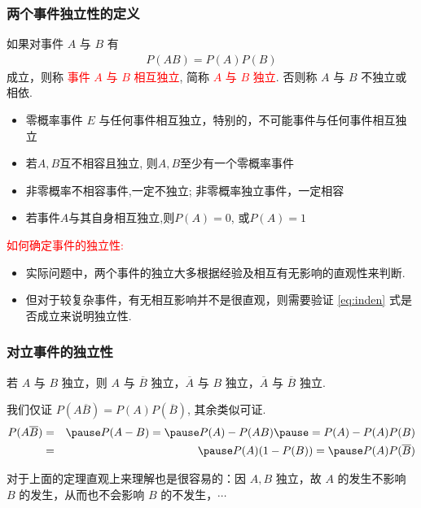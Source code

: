\documentclass[Prob-All.tex]{subfiles}
\begin{document}
\begin{frame}
  \frametitle{两个事件独立性的定义}
  \begin{defi}
    如果对事件 $A$ 与 $B$ 有
    \begin{eqnarray*}
      P(AB)=P(A)P(B)
    \end{eqnarray*}
    成立，则称 \textcolor{red}{事件 $A$ 与 $B$ 相互独立}, 简称 \textcolor{red}{$A$ 与 $B$ 独立}. 否则称 $A$ 与 $B$ 不独立或相依.
  \end{defi}

\begin{rmk}
	\begin{itemize}
		\item 零概率事件 $E$ 与任何事件相互独立，特别的，不可能事件与任何事件相互独立
		\item 若$A, B$互不相容且独立, 则$A, B$至少有一个零概率事件
        \item 非零概率不相容事件,一定不独立; 非零概率独立事件，一定相容
        \item 若事件$A$与其自身相互独立,则$P(A)=0$, 或$P(A)=1$
\end{itemize}


\end{rmk}

\pause
  \textcolor{red}{如何确定事件的独立性: }
  \begin{itemize}[<+-|alert@+>]
  \item 实际问题中，两个事件的独立大多根据经验及相互有无影响的直观性来判断.
  \item 但对于较复杂事件，有无相互影响并不是很直观，则需要验证 \eqref{eq:inden} 式是否成立来说明独立性.
  \end{itemize}
\end{frame}


 \begin{frame}
	\frametitle{对立事件的独立性}
	\begin{thm}
		若 $A$ 与 $B$ 独立，则 $A$ 与 $\overline{B}$ 独立，$\overline{A}$ 与 $B$ 独立，$\overline{A}$ 与 $\overline{B}$ 独立.
	\end{thm}
	\pause

	\zheng 我们仅证 $P (A\overline{B})=P (A) P (\overline{B})$, 其余类似可证.
	\begin{eqnarray*}
		P(A\overline{B})&=&\pause P(A-B)=\pause P(A)-P(AB)\pause =P(A)-P(A)P(B)\\
		&=&\pause P(A)(1-P(B))=\pause P(A)P(\overline{B})
	\end{eqnarray*}

	\pause
	对于上面的定理直观上来理解也是很容易的：因 $A,B$ 独立，故 $A$ 的发生不影响 $B$ 的发生，从而也不会影响 $B$ 的不发生，$\cdots$
\end{frame}
\end{document}
